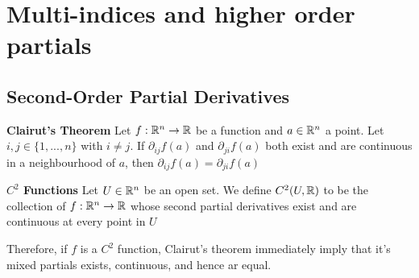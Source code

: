 \documentclass[11pt]{article}
\begin{document}
\section{Multi-indices and higher order partials}

\subsection{Second-Order Partial Derivatives}


\begin{theorem}
  \label{Clairut's Theorem}
  \textbf{Clairut's Theorem} Let $f:\mathbb{R}^n \rightarrow \mathbb{R}$ be a function and $a\in\mathbb{R}^n$ a point. Let $i,j \in \{ 1, ..., n \}$  with $i\neq j$. If $\partial_{ij} f(a)$ and $\partial_{ji} f(a)$ both exist and are continuous in a neighbourhood of $a$, then $\partial_{ij} f(a) = \partial_{ji} f(a)$
\end{theorem}

\begin{defn}
  \label{C2 functions} \textbf{$C^2$ Functions} Let $U\in\mathbb{R}^n$ be an open set. We define $C^2(U, \mathbb{R})$ to be the collection of $f:\mathbb{R}^n \rightarrow \mathbb{R}$ whose second partial derivatives exist and are continuous at every point in $U$

  \begin{rem}
    Therefore, if $f$ is a $C^2$ function, Clairut's theorem immediately imply that it's mixed partials exists, continuous, and hence ar equal.
  \end{rem}
\end{defn}
\end{document}
